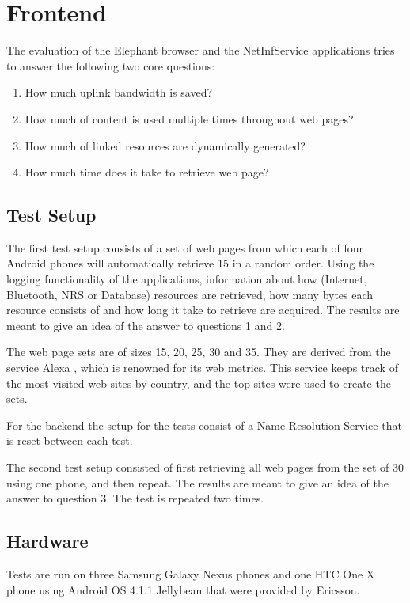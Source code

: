 \section{Frontend}

The evaluation of the Elephant browser and the NetInfService applications tries to answer the following two core questions:

\begin{enumerate}
\item How much uplink bandwidth is saved?
\item How much of content is used multiple times throughout web pages?
\item How much of linked resources are dynamically generated?
\item How much time does it take to retrieve web page?
\end{enumerate}

\subsection{Test Setup}

The first test setup consists of a set of web pages from which each of four Android phones will automatically retrieve 15 in a random order. Using the logging functionality of the applications, information about how (Internet, Bluetooth, NRS or Database) resources are retrieved, how many bytes each resource consists of and how long it take to retrieve are acquired. The results are meant to give an idea of the answer to questions 1 and 2.

The web page sets are of sizes 15, 20, 25, 30 and 35. They are derived from the service Alexa \cite{alexa}, which is renowned for its web metrics. This service keeps track of the most visited web sites by country, and the top sites were used to create the sets.

For the backend the setup for the tests consist of a Name Resolution Service that is reset between each test.

The second test setup consisted of first retrieving all web pages from the set of 30 using one phone, and then repeat. The results are meant to give an idea of the answer to question 3. The test is repeated two times. 

\subsection{Hardware}

Tests are run on three Samsung Galaxy Nexus phones and one HTC One X phone using Android OS 4.1.1 Jellybean that were provided by Ericsson.

